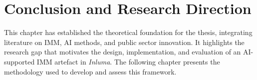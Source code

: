 \section{Conclusion and Research Direction}\label{sec:conclusion}
This chapter has established the theoretical foundation for the thesis, integrating literature on IMM, AI methods, and public sector innovation.
It highlights the research gap that motivates the design, implementation, and evaluation of an AI-supported IMM artefact in \textit{Inluma}.
The following chapter presents the methodology used to develop and assess this framework.